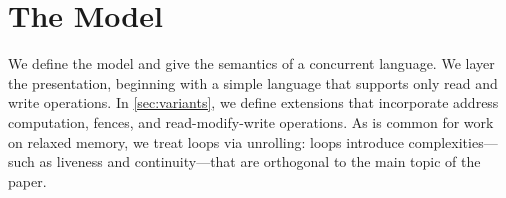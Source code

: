 \section{The Model}
\label{sec:model}

We define the model and give the semantics of a concurrent language.  We
layer the presentation, beginning with a simple language that supports only
read and write operations.  In \textsection\ref{sec:variants}, we define
extensions that incorporate address computation, fences, and
read-modify-write operations.  As is common for work on relaxed memory, we
treat loops via unrolling: loops introduce complexities---such as liveness
and continuity---that are orthogonal to the main topic of the paper.
\begin{comment}
https://preshing.com/20131125/acquire-and-release-fences-dont-work-the-way-youd-expect/

Cannot encode R/A actions with actions+fences...

A release operation prevents preceding memory operations from being delayed
past it (a;Rel =/=> Rel;a)
 
A release fence prevents preceding memory operations from being delayed past
subsequent writes (a;FR;w =/=> w;a;FR)

An acquire operation prevents subsequent memory operations from being advanced
before it (Acq;a =/=> a;Acq)

An acquire fence prevents subsequent memory operations from being advanced
before prior reads (r;FA;a =/=> FA;a;r)

https://www.modernescpp.com/index.php/fences-as-memory-barriers

StoreLoad: Full fence allows a store before to be reordered with respect to a
load after (wx;F;ry) ===> (ry;F;wx)

StoreLoad+LoadLoad: Release fence also allows (rx;FR;ry) ===> (ry;FR;rx)

StoreLoad+StoreStore: Acquire fence also allows (wx;FR;wy) ===> (wy;FR;wx)

LoadStore: No fence allows a prior load to reorder w.r.t. a subsequent store
(rx;FR;wy) =/=> (wy;FR;rx)

https://preshing.com/20120710/memory-barriers-are-like-source-control-operations/
Good news is that a fullFence does it.

Bizarrely, it seems this is not supported in C++... You have to go to assembly.
\end{comment}

